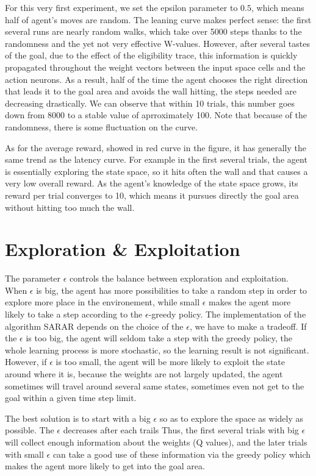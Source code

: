 \documentclass[a4paper, 11pt]{article}
\begin{document}
For this very first experiment, we set the epsilon parameter to $0.5$,
which means half of agent's moves are random. The leaning curve makes
perfect sense: the first several runs are nearly random walks, which
take over 5000 steps thanks to the randomness and the yet not very
effective W-values. However, after several tastes of the goal, due to
the effect of the eligibility trace, this information is quickly
propagated throughout the weight vectors between the input space cells
and the action neurons. As a result, half of the time the agent
chooses the right direction that leads it to the goal area and avoids
the wall hitting, the steps needed are decreasing drastically. We can
observe that within 10 trials, this number goes down from 8000 to
a stable value of aprroximately 100. Note that because of the
randomness, there is some fluctuation on the curve.

As for the average reward, showed in red curve in the figure, it has
generally the same trend as the latency curve. For example in the
first several trials, the agent is essentially exploring the state
space, so it hits often the wall and that causes a very low overall
reward. As the agent's knowledge of the state space grows, its reward
per trial converges to 10, which means it pursues directly the goal
area without hitting too much the wall.

\section{Exploration \& Exploitation}
The parameter $\epsilon$ controls the balance between exploration and exploitation. When $\epsilon$ is big, the agent has more possibilities to take a random step in order to explore more place in the environement, while small $\epsilon$ makes the agent more likely to take a step according to the $\epsilon$-greedy policy. The implementation of the algorithm SARAR depends on the choice of the $\epsilon$, we have to make a tradeoff. If the $\epsilon$ is too big, the agent will seldom take a step with the greedy policy, the whole learning process is more stochastic, so the learning result is not significant. However, if $\epsilon$ is too small, the agent will be more likely to exploit the state around where it is, because the weights are not largely updated, the agent sometimes will travel around several same states, sometimes even not get to the goal within a given time step limit.

The best solution is to start with a big $\epsilon$ so as to explore the space as widely as possible. The $\epsilon$ decreases after each trails Thus, the first several trials with big $\epsilon$ will collect enough information about the weights (Q values), and the later trials with small $\epsilon$ can take a good use of these information via the greedy policy which makes the agent more likely to get into the goal area.
\end{document}
